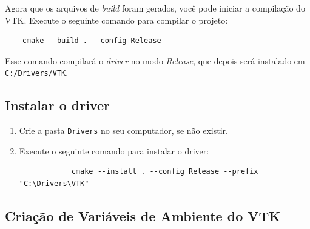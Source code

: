 \documentclass[a4paper,11pt]{article}
\begin{document}
Agora que os arquivos de \textit{build} foram gerados, você pode iniciar a compilação do VTK. Execute o seguinte comando para compilar o projeto:
\begin{mdframed}
	\begin{verbatim}
	cmake --build . --config Release 
	\end{verbatim}
\end{mdframed}

Esse comando compilará o \textit{driver} no modo \textit{Release}, que depois será instalado em {\tt C:/Drivers/VTK}.

\subsection*{Instalar o driver}

\begin{enumerate}
	\item Crie a pasta {\tt Drivers} no seu computador, se não existir.
	\item Execute o seguinte comando para instalar o driver:
	
	\begin{mdframed}
		\begin{verbatim}
			cmake --install . --config Release --prefix "C:\Drivers\VTK"
		\end{verbatim}
	\end{mdframed}
\end{enumerate}


\subsection*{Criação de Variáveis de Ambiente do VTK}
\end{document}

